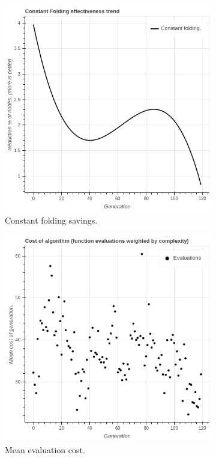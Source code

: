 \begin{figure}
        \begin{subfigure}{0.5\textwidth}
    \centering
        \includegraphics[width=0.8\linewidth]{figures/viz_constantfoldingtrend.png}
        \caption{Constant folding savings.}
    \end{subfigure}%
    \begin{subfigure}{0.5\textwidth}
    \centering
        \includegraphics[width=0.8\linewidth]{figures/viz_meancost.png}
        \caption{Mean evaluation cost.}
    \end{subfigure}
        \begin{subfigure}{0.5\textwidth}

\end{subfigure}
\end{figure}
